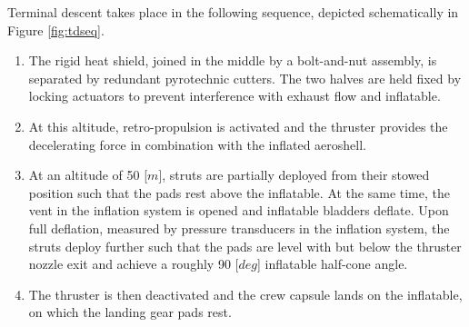 Terminal descent takes place in the following sequence, depicted schematically in Figure \ref{fig:tdseq}.
\begin{enumerate}
\item The rigid heat shield, joined in the middle by a bolt-and-nut assembly, is separated by redundant pyrotechnic cutters. The two halves are held fixed by locking actuators to prevent interference with exhaust flow and inflatable.
\item At this altitude, retro-propulsion is activated and the thruster provides the decelerating force in combination with the inflated aeroshell.
\item At an altitude of 50 [$m$], struts are partially deployed from their stowed position such that the pads rest above the inflatable. At the same time, the vent in the inflation system is opened and inflatable bladders deflate. Upon full deflation, measured by pressure transducers in the inflation system, the struts deploy further such that the pads are level with but below the thruster nozzle exit and achieve a roughly 90 [$deg$] inflatable half-cone angle.
\item The thruster is then deactivated and the crew capsule lands on the inflatable, on which the landing gear pads rest.
\end{enumerate}
